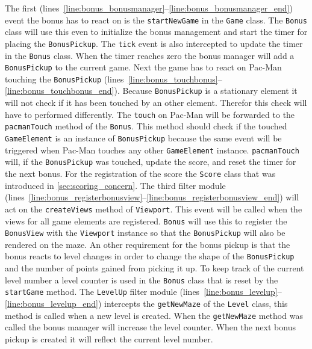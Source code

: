 The first (lines~\ref{line:bonus_bonusmanager}--\ref{line:bonus_bonusmanager_end}) event the bonus has to react on is the \lstinline|startNewGame| in the \lstinline|Game| class. The \lstinline|Bonus| class will use this even to initialize the bonus management and start the timer for placing the \lstinline|BonusPickup|. The \lstinline|tick| event is also intercepted to update the timer in the \lstinline|Bonus| class. When the timer reaches zero the bonus manager will add a \lstinline|BonusPickup| to the current game.
Next the game has to react on Pac-Man touching the \lstinline|BonusPickup| (lines~\ref{line:bonus_touchbonus}--\ref{line:bonus_touchbonus_end}). Because \lstinline|BonusPickup| is a stationary element it will not check if it has been touched by an other element. Therefor this check will have to performed differently. The \lstinline|touch| on Pac-Man will be forwarded to the \lstinline|pacmanTouch| method of the \lstinline|Bonus|. This method should check if the touched \lstinline|GameElement| is an instance of \lstinline|BonusPickup| because the same event will be triggered when Pac-Man touches any other \lstinline|GameElement| instance. \lstinline|pacmanTouch| will, if the \lstinline|BonusPickup| was touched, update the score, and reset the timer for the next bonus. For the registration of the score the \lstinline|Score| class that was introduced in \ref{sec:scoring_concern}.
The third filter module (lines~\ref{line:bonus_registerbonusview}--\ref{line:bonus_registerbonusview_end}) will act on the \lstinline|createViews| method of \lstinline|Viewport|. This event will be called when the views for all game elements are registered. \lstinline|Bonus| will use this to register the \lstinline|BonusView| with the \lstinline|Viewport| instance so that the \lstinline|BonusPickup| will also be rendered on the maze.
An other requirement for the bonus pickup is that the bonus reacts to level changes in order to change the shape of the \lstinline|BonusPickup| and the number of points gained from picking it up. To keep track of the current level number a level counter is used in the \lstinline|Bonus| class that is reset by the \lstinline|startGame| method. The \lstinline|LevelUp| filter module (lines~\ref{line:bonus_levelup}--\ref{line:bonus_levelup_end}) intercepts the \lstinline|getNewMaze| of the \lstinline|Level| class, this method is called when a new level is created. When the \lstinline|getNewMaze| method was called the bonus manager will increase the level counter. When the next bonus pickup is created it will reflect the current level number.

